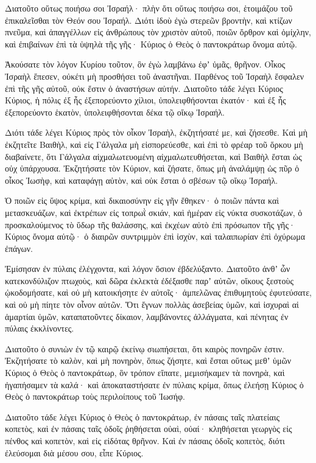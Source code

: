 \begin{spacing}{1.1}
\begin{multicols}{2}
Διατοῦτο οὕτως ποιήσω σοι Ἰσραήλ· πλὴν ὅτι οὕτως ποιήσω σοι, ἑτοιμάζου τοῦ ἐπικαλεῖσθαι τὸν Θεόν σου Ἰσραήλ.
Διότι ἰδοὺ ἐγὼ στερεῶν βροντὴν, καὶ κτίζων πνεῦμα, καὶ ἀπαγγέλλων εἰς ἀνθρώπους τὸν χριστὸν αὐτοῦ, ποιῶν ὄρθρον καὶ ὁμίχλην, καὶ ἐπιβαίνων ἐπὶ τὰ ὑψηλὰ τῆς γῆς· Κύριος ὁ Θεὸς ὁ παντοκράτωρ ὄνομα αὐτῷ.

Ἀκούσατε τὸν λόγον Κυρίου τοῦτον, ὃν ἐγὼ λαμβάνω ἐφʼ ὑμᾶς, θρῆνον. Οἶκος Ἰσραὴλ
ἔπεσεν, οὐκέτι μὴ προσθήσει τοῦ ἀναστῆναι. Παρθένος τοῦ Ἰσραὴλ ἔσφαλεν ἐπὶ τῆς γῆς αὐτοῦ, οὐκ ἔστιν ὁ ἀναστήσων αὐτήν.
Διατοῦτο τάδε λέγει Κύριος Κύριος, ἡ πόλις ἐξ ἧς ἐξεπορεύοντο χίλιοι, ὑπολειφθήσονται ἑκατόν· καὶ ἐξ ἧς ἐξεπορεύοντο ἑκατὸν, ὑπολειφθήσονται δέκα τῷ οἴκῳ Ἰσραήλ.

Διότι τάδε λέγει Κύριος πρὸς τὸν οἶκον Ἰσραὴλ, ἐκζητήσατέ με, καὶ ζήσεσθε.
Καὶ μὴ ἐκζητεῖτε Βαιθὴλ, καὶ εἰς Γάλγαλα μὴ εἰσπορεύεσθε, καὶ ἐπὶ τὸ φρέαρ τοῦ ὅρκου μὴ διαβαίνετε, ὅτι Γάλγαλα αἰχμαλωτευομένη αἰχμαλωτευθήσεται, καὶ Βαιθὴλ ἔσται ὡς οὐχ ὑπάρχουσα.
Ἐκζητήσατε τὸν Κύριον, καὶ ζήσατε, ὅπως μὴ ἀναλάμψῃ ὡς πῦρ ὁ οἶκος Ἰωσὴφ, καὶ καταφάγῃ αὐτὸν, καὶ οὐκ ἔσται ὁ σβέσων τῷ οἴκῳ Ἰσραήλ.

Ὁ ποιῶν εἰς ὕψος κρίμα, καὶ δικαιοσύνην εἰς γῆν ἔθηκεν·
ὁ ποιῶν πάντα καὶ μετασκευάζων, καὶ ἐκτρέπων εἰς τοπρωῒ σκιάν, καὶ ἡμέραν εἰς νύκτα συσκοτάζων, ὁ προσκαλούμενος τὸ ὕδωρ τῆς θαλάσσης, καὶ ἐκχέων αὐτὸ ἐπὶ πρόσωπον τῆς γῆς· Κύριος ὄνομα αὐτῷ·
ὁ διαιρῶν συντριμμὸν ἐπὶ ἰσχὺν, καὶ ταλαιπωρίαν ἐπὶ ὀχύρωμα ἐπάγων.

Ἐμίσησαν ἐν πύλαις ἐλέγχοντα, καὶ λόγον ὅσιον ἐβδελύξαντο.
Διατοῦτο ἀνθʼ ὧν κατεκονδύλιζον πτωχοὺς, καὶ δῶρα ἐκλεκτὰ ἐδέξασθε παρʼ αὐτῶν, οἴκους ξεστοὺς ᾠκοδομήσατε, καὶ οὐ μὴ κατοικήσητε ἐν αὐτοῖς· ἀμπελῶνας ἐπιθυμητοὺς ἐφυτεύσατε, καὶ οὐ μὴ πίητε τὸν οἶνον αὐτῶν.
Ὅτι ἔγνων πολλὰς ἀσεβείας ὑμῶν, καὶ ἰσχυραὶ αἱ ἁμαρτίαι ὑμῶν, καταπατοῦντες δίκαιον, λαμβάνοντες ἀλλάγματα, καὶ πένητας ἐν πύλαις ἐκκλίνοντες.

Διατοῦτο ὁ συνιὼν ἐν τῷ καιρῷ ἐκείνῳ σιωπήσεται, ὅτι καιρὸς πονηρῶν ἐστιν.
Ἐκζητήσατε τὸ καλὸν, καὶ μὴ πονηρὸν, ὅπως ζήσητε, καὶ ἔσται οὕτως μεθʼ ὑμῶν Κύριος ὁ Θεὸς ὁ παντοκράτωρ, ὃν τρόπον εἴπατε,
μεμισήκαμεν τὰ πονηρὰ, καὶ ἠγαπήσαμεν τὰ καλά· καὶ ἀποκαταστήσατε ἐν πύλαις κρίμα, ὅπως ἐλεήσῃ Κύριος ὁ Θεὸς ὁ παντοκράτωρ τοὺς περιλοίπους τοῦ Ἰωσήφ.

Διατοῦτο τάδε λέγει Κύριος ὁ Θεὸς ὁ παντοκράτωρ, ἐν πάσαις ταῖς πλατείαις κοπετὸς, καὶ ἐν πάσαις ταῖς ὁδοῖς ῥηθήσεται οὐαὶ, οὐαί· κληθήσεται γεωργὸς εἰς πένθος καὶ κοπετὸν, καὶ εἰς εἰδότας θρῆνον.
Καὶ ἐν πάσαις ὁδοῖς κοπετὸς, διότι ἐλεύσομαι διὰ μέσου σου, εἶπε Κύριος.


\end{multicols}
\end{spacing}
